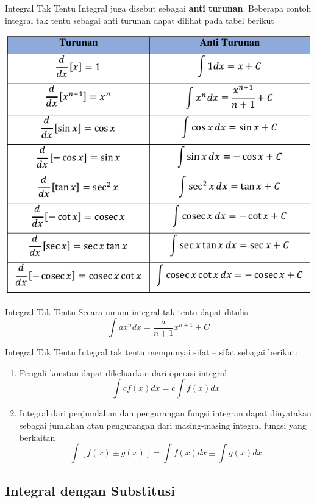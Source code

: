 \documentclass[pdflatex,compress,mathserif]{beamer}
\begin{document}
		\begin{frame}{Integral Tak Tentu}
			Integral juga disebut sebagai \textbf{anti turunan}. Beberapa contoh integral tak tentu sebagai anti turunan dapat dilihat pada tabel berikut
			\begin{center}
				\includegraphics[width=0.6\linewidth]{pict/35}
			\end{center}
		\end{frame}
		
		\begin{frame}{Integral Tak Tentu}
			Secara umum integral tak tentu dapat ditulis
			\begin{equation}
				\int ax^n dx = \frac{a}{n+1}x^{n+1} + C
			\end{equation}
		\end{frame}
	
		\begin{frame}{Integral Tak Tentu}
			Integral tak tentu mempunyai sifat – sifat sebagai berikut:
			\begin{enumerate}
				\item Pengali konstan dapat dikeluarkan dari operasi integral
				\begin{equation}
					\int c f(x) dx = c \int f(x) dx
				\end{equation}
				\item  Integral dari penjumlahan dan pengurangan fungsi integran dapat dinyatakan sebagai jumlahan atau pengurangan dari masing-masing integral fungsi yang berkaitan
				\begin{equation}
					\int [f(x) \pm g(x)] = \int f(x) dx \pm \int g(x) dx
				\end{equation}
			\end{enumerate}
		\end{frame}
	
	\subsection{Integral dengan Substitusi}
	
\end{document}
